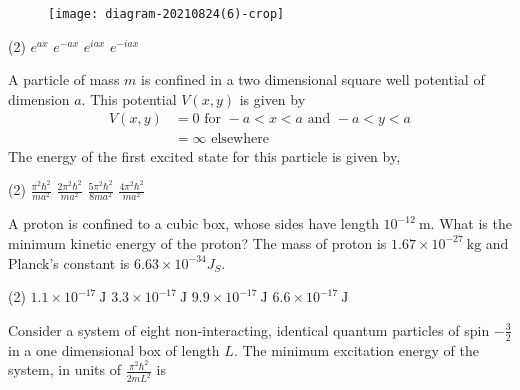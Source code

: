 \begin{enumerate}
\begin{minipage}{\textwidth}
	\begin{figure}[H]
		\centering
		\texttt{[image: diagram-20210824(6)-crop]}
	\end{figure}
\end{minipage}
\begin{tasks}(2)
	\task[\textbf{A.}] $e^{a x}$
	\task[\textbf{B.}] $e^{-a x}$
	\task[\textbf{C.}] $e^{i a x}$
	\task[\textbf{D.}]$e^{-i a x}$
\end{tasks}
\begin{minipage}{\textwidth}
	\item A particle of mass $m$ is confined in a two dimensional square well potential of dimension $a$. This potential $V(x, y)$ is given by
	$$
	\begin{aligned}
	V(x, y) &=0 \text { for }-a<x<a \text { and }-a<y<a \\
	&=\infty \text { elsewhere }
	\end{aligned}
	$$
	The energy of the first excited state for this particle is given by,
\end{minipage}
\begin{tasks}(2)
	\task[\textbf{A.}]$\frac{\pi^{2} \hbar^{2}}{m a^{2}}$
	\task[\textbf{B.}] $\frac{2 \pi^{2} \hbar^{2}}{m a^{2}}$
	\task[\textbf{C.}]$\frac{5 \pi^{2} \hbar^{2}}{8 m a^{2}}$
	\task[\textbf{D.}] $\frac{4 \pi^{2} \hbar^{2}}{m a^{2}}$
\end{tasks}
\begin{minipage}{\textwidth}
	\item A proton is confined to a cubic box, whose sides have length $10^{-12} \mathrm{~m}$. What is the minimum kinetic energy of the proton? The mass of proton is $1.67 \times 10^{-27} \mathrm{~kg}$ and Planck's constant is $6.63 \times 10^{-34} J_{S}$.
\end{minipage}
\begin{tasks}(2)
	\task[\textbf{A.}] $1.1 \times 10^{-17} \mathrm{~J}$
	\task[\textbf{B.}] $3.3 \times 10^{-17} \mathrm{~J}$
	\task[\textbf{C.}]$9.9 \times 10^{-17} \mathrm{~J}$
	\task[\textbf{D.}]$6.6 \times 10^{-17} \mathrm{~J}$
\end{tasks}
\begin{minipage}{\textwidth}
	\item Consider a system of eight non-interacting, identical quantum particles of spin $-\frac{3}{2}$ in a one dimensional box of length $L$. The minimum excitation energy of the system, in units of $\frac{\pi^{2} \hbar^{2}}{2 m L^{2}}$ is

\end{minipage}
\end{enumerate}
